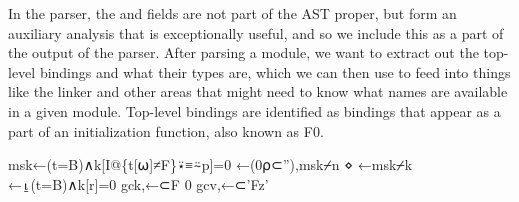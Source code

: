 \documentclass{article}%
\begin{document}
In the parser,
the {\Tt{}\nwendquote} and {\Tt{}\nwendquote} fields are not part of the AST proper, 
but form an auxiliary analysis that is exceptionally useful,
and so we include this as a part of the output of the parser.
After parsing a module, we want to extract out the top-level 
bindings and what their types are,
which we can then use to feed into things like the linker 
and other areas that might need to know what names are available
in a given module.
Top-level bindings are identified as bindings that appear as a 
part of an initialization function, also known as {\Tt{}F0\nwendquote}.

\nwenddocs{}\endmoddef\nwstartdeflinemarkup{}\nwenddeflinemarkup
msk←(t=B)∧k[I@\{t[⍵]≠F\}⍣≡⍨p]=0
←(0⍴⊂''),msk⌿n ⋄ ←msk⌿k
\eatline
{}\nwendcode{}\nwdocspar
\nwenddocs{}\endmoddef\nwstartdeflinemarkup{}\nwenddeflinemarkup
{}←⍸(t=B)∧k[r]=0
\eatline
{}\nwendcode{}\nwdocspar
\nwenddocs{}\plusendmoddef\nwstartdeflinemarkup{}\nwenddeflinemarkup
gck,←⊂F 0
gcv,←⊂'Fz'
\nwendcode{}\nwdocspar
\end{document}
